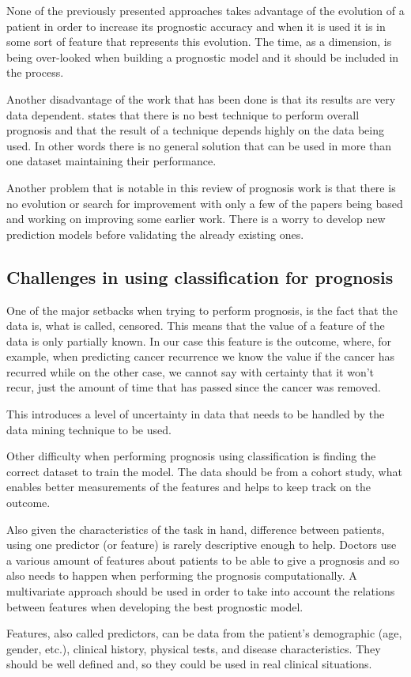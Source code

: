 None of the previously presented approaches takes advantage of the evolution of a patient in order to increase its prognostic
 accuracy and when it is used it is in some sort of feature that represents this evolution. The time, as a dimension, is being 
 over-looked when building a prognostic model and it should be included in the process.

Another disadvantage of the work that has been done is that its results are very data dependent. \cite{Endo2008}
 states that there is no best technique to perform overall prognosis and that the result of a technique depends highly on the data 
 being used. In other words there is no general solution that can be used in more than one dataset maintaining their performance.

Another problem that is notable in this review of prognosis work is that there is no evolution or search for improvement with
 only a few of the papers being based and working on improving some earlier work. There is a worry to develop new prediction 
 models before validating the already existing ones.
 
 \subsection{Challenges in using classification for prognosis}
 \label{subsection:difficulties}
 
One of the major setbacks when trying to perform prognosis, is the fact that the data is, what is called, censored. This means that 
the value of a feature of the data is only partially known. In our case this feature is the outcome, where, for example, when 
predicting cancer recurrence we know the value if the cancer has recurred while on the other case, we cannot say with certainty 
that it won’t recur, just the amount of time that has passed since the cancer was removed. 

This introduces a level of uncertainty in data that needs to be handled by the data mining technique to be used.

Other difficulty when performing prognosis using classification is finding the correct dataset to train the model. The data
 should be from a cohort study, what enables better measurements of the features and helps to keep track on the outcome.

Also given the characteristics of the task in hand, difference between patients, using one predictor (or feature) is rarely 
descriptive enough to help. Doctors use a various amount of features about patients to be able to give a prognosis and so 
also needs to happen when performing the prognosis computationally. A multivariate approach should be used in order to take
 into account the relations between features when developing the best prognostic model.

Features, also called predictors, can be data from the patient’s demographic (age, gender, etc.), clinical history, physical 
tests, and disease characteristics. They should be well defined and, so they could be used in real clinical situations.



 
\cleardoublepage
